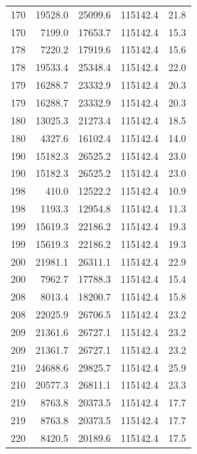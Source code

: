 \begin{longtable}{rrrrr}
    170 & \num{19528.0} & \num{25099.6} & \num{115142.4} & 21.8 \\
    170 & \num{7199.0} & \num{17653.7} & \num{115142.4} & 15.3 \\
    178 & \num{7220.2} & \num{17919.6} & \num{115142.4} & 15.6 \\
    178 & \num{19533.4} & \num{25348.4} & \num{115142.4} & 22.0 \\
    179 & \num{16288.7} & \num{23332.9} & \num{115142.4} & 20.3 \\
    179 & \num{16288.7} & \num{23332.9} & \num{115142.4} & 20.3 \\
    180 & \num{13025.3} & \num{21273.4} & \num{115142.4} & 18.5 \\
    180 & \num{4327.6} & \num{16102.4} & \num{115142.4} & 14.0 \\
    190 & \num{15182.3} & \num{26525.2} & \num{115142.4} & 23.0 \\
    190 & \num{15182.3} & \num{26525.2} & \num{115142.4} & 23.0 \\
    198 & \num{410.0} & \num{12522.2} & \num{115142.4} & 10.9 \\
    198 & \num{1193.3} & \num{12954.8} & \num{115142.4} & 11.3 \\
    199 & \num{15619.3} & \num{22186.2} & \num{115142.4} & 19.3 \\
    199 & \num{15619.3} & \num{22186.2} & \num{115142.4} & 19.3 \\
    200 & \num{21981.1} & \num{26311.1} & \num{115142.4} & 22.9 \\
    200 & \num{7962.7} & \num{17788.3} & \num{115142.4} & 15.4 \\
    208 & \num{8013.4} & \num{18200.7} & \num{115142.4} & 15.8 \\
    208 & \num{22025.9} & \num{26706.5} & \num{115142.4} & 23.2 \\
    209 & \num{21361.6} & \num{26727.1} & \num{115142.4} & 23.2 \\
    209 & \num{21361.7} & \num{26727.1} & \num{115142.4} & 23.2 \\
    210 & \num{24688.6} & \num{29825.7} & \num{115142.4} & 25.9 \\
    210 & \num{20577.3} & \num{26811.1} & \num{115142.4} & 23.3 \\
    219 & \num{8763.8} & \num{20373.5} & \num{115142.4} & 17.7 \\
    219 & \num{8763.8} & \num{20373.5} & \num{115142.4} & 17.7 \\
    220 & \num{8420.5} & \num{20189.6} & \num{115142.4} & 17.5 \\

\end{longtable}
